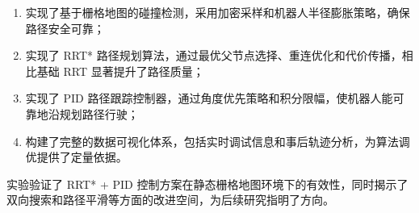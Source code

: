 \documentclass{SYSUReport}
\begin{document}
\begin{enumerate}
    \item 实现了基于栅格地图的碰撞检测，采用加密采样和机器人半径膨胀策略，确保路径安全可靠；
    \item 实现了 RRT* 路径规划算法，通过最优父节点选择、重连优化和代价传播，相比基础 RRT 显著提升了路径质量；
    \item 实现了 PID 路径跟踪控制器，通过角度优先策略和积分限幅，使机器人能可靠地沿规划路径行驶；
    \item 构建了完整的数据可视化体系，包括实时调试信息和事后轨迹分析，为算法调优提供了定量依据。
\end{enumerate}

实验验证了 RRT* + PID 控制方案在静态栅格地图环境下的有效性，同时揭示了双向搜索和路径平滑等方面的改进空间，为后续研究指明了方向。
\end{document}
